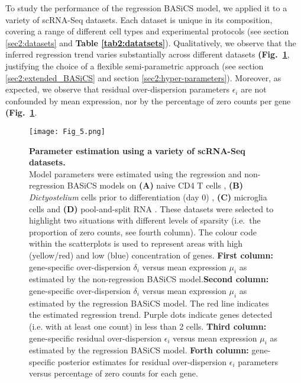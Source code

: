 To study the performance of the regression BASiCS model, we applied it to a variety of scRNA-Seq datasets. Each dataset is unique in its composition, covering a range of different cell types and experimental protocols (see section \ref{sec2:datasets} and \textbf{Table \ref{tab2:datatsets}}). Qualitatively, we observe that the inferred regression trend varies substantially across different datasets \textbf{(Fig.~\ref{fig2:datasets}}, justifying the choice of a flexible semi-parametric approach (see section \ref{sec2:extended_BASiCS} and section \ref{sec2:hyper-parameters}). Moreover, as expected, we observe that residual over-dispersion parameters $\epsilon_i$ are not confounded by mean expression, nor by the percentage of zero counts per gene \textbf{(Fig.~\ref{fig2:datasets}}. \\

\newpage

\begin{figure}[!h]
\centering
\texttt{[image: Fig\_5.png]}
\caption[Parameter estimation using a variety of scRNA-Seq datasets]{\textbf{Parameter estimation using a variety of scRNA-Seq datasets.}\\
Model parameters were estimated using the regression and non-regression BASiCS models on \textbf{(A)} naive CD4\plus{} T cells \citep{Martinez-jimenez2017}, \textbf{(B)} \textit{Dictyostelium} cells prior to differentiation (day 0) \citep{Antolovic2017}, \textbf{(C)} microglia cells \citep{Zeisel2015} and \textbf{(D)} pool-and-split RNA \citep{Grun2014}. These datasets were selected to highlight two situations with different levels of sparsity (i.e.~the proportion of zero counts, see fourth column). The colour code within the scatterplots is used to represent areas with high (yellow/red) and low (blue) concentration of genes. \textbf{First column:} gene-specific over-dispersion $\delta_i$ versus mean expression $\mu_i$ as estimated by the non-regression BASiCS model.\textbf{Second column:} gene-specific over-dispersion $\delta_i$ versus mean expression $\mu_i$ as estimated by the regression BASiCS model. The red line indicates the estimated regression trend. Purple dots indicate genes detected (i.e. with at least one count) in less than 2 cells. \textbf{Third column:} gene-specific residual over-dispersion $\epsilon_i$ versus mean expression $\mu_i$ as estimated by the regression BASiCS model. \textbf{Forth column:} gene-specific posterior estimates for residual over-dispersion $\epsilon_i$ parameters versus percentage of zero counts for each gene.\\}
\label{fig2:datasets}
\end{figure}

